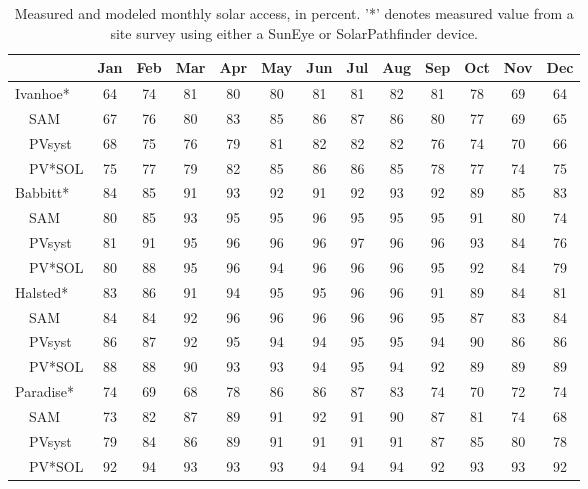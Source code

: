 \documentclass[twocolumn,10pt]{asme2ej}
\begin{document}
\begin{table}[h!]
\begin{center}
\begin{tabular}{lcccccccccccc}
 & Jan & Feb & Mar & Apr & May & Jun & Jul & Aug & Sep & Oct & Nov & Dec \\
\hline
Ivanhoe* & 64 & 74 & 81 & 80 & 80 & 81 & 81 & 82 & 81 & 78 & 69 & 64 \\
~~SAM & 67 & 76 & 80 & 83 & 85 & 86 & 87 & 86 & 80 & 77 & 69 & 65 \\
~~PVsyst & 68 & 75 & 76 & 79 & 81 & 82 & 82 & 82 & 76 & 74 & 70 & 66 \\
~~PV*SOL & 75 & 77 & 79 & 82 & 85 & 86 & 86 & 85 & 78 & 77 & 74 & 75 \\
\hline
Babbitt* & 84 & 85 & 91 & 93 & 92 & 91 & 92 & 93 & 92 & 89 & 85 & 83 \\
~~SAM & 80 & 85 & 93 & 95 & 95 & 96 & 95 & 95 & 95 & 91 & 80 & 74 \\
~~PVsyst & 81 & 91 & 95 & 96 & 96 & 96 & 97 & 96 & 96 & 93 & 84 & 76 \\
~~PV*SOL & 80 & 88 & 95 & 96 & 94 & 96 & 96 & 96 & 95 & 92 & 84 & 79 \\
\hline
Halsted* & 83 & 86 & 91 & 94 & 95 & 95 & 96 & 96 & 91 & 89 & 84 & 81 \\
~~SAM & 84 & 84 & 92 & 96 & 96 & 96 & 96 & 96 & 95 & 87 & 83 & 84 \\
~~PVsyst & 86 & 87 & 92 & 95 & 94 & 94 & 95 & 95 & 94 & 90 & 86 & 86 \\
~~PV*SOL & 88 & 88 & 90 & 93 & 93 & 94 & 95 & 94 & 92 & 89 & 89 & 89 \\
\hline
Paradise* & 74 & 69 & 68 & 78 & 86 & 86 & 87 & 83 & 74 & 70 & 72 & 74 \\
~~SAM & 73 & 82 & 87 & 89 & 91 & 92 & 91 & 90 & 87 & 81 & 74 & 68 \\
~~PVsyst & 79 & 84 & 86 & 89 & 91 & 91 & 91 & 91 & 87 & 85 & 80 & 78 \\
~~PV*SOL & 92 & 94 & 93 & 93 & 93 & 94 & 94 & 94 & 92 & 93 & 93 & 92 \\
\end{tabular}
\caption{Measured and modeled monthly solar access, in percent. '*' denotes measured value from a site survey using either a SunEye or SolarPathfinder device.}
\label{Label}
\end{center}
\end{table}
\end{document}
